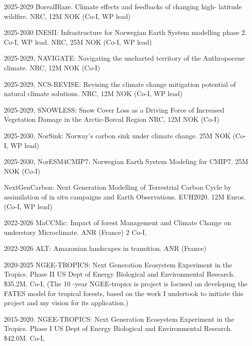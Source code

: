 \documentclass[10pt]{article}
\newenvironment{lonelist}[1][\enskip\textbullet]%
        {\vspace{-\baselineskip}\begin{list}{#1}{%
        \setlength{\itemindent}{-3pt} 
        \setlength{\partopsep}{0pt}%
        \setlength{\leftmargin}{10pt}
        \setlength{\topsep}{15pt}}}
        {\end{list}\vspace{-.3\baselineskip}}
\begin{document}
\begin{lonelist}

\item 2025-2029 BorealBlaze. Climate effects and feedbacks of changing high-
latitude wildfire.  NRC, 12M NOK (Co-I, WP lead) 

\item 2025-2030 INESII: Infrastructure for Norwegian Earth System modelling phase 2.  Co-I, WP lead. NRC, 25M NOK (Co-I, WP lead) 

\item 2025-2029, NAVIGATE: Navigating the uncharted territory of the Anthropocene climate. NRC, 12M NOK (Co-I) 

\item 2025-2029, NCS-REVISE: Revising the climate change mitigation potential of natural climate solutions. NRC, 12M NOK (Co-I, WP lead) 

\item 2025-2029, SNOWLESS:  Snow Cover Loss as a Driving Force of Increased Vegetation Damage in the Arctic-Boreal Region NRC, 12M NOK (Co-I) 

\item 2025-2030, NorSink: Norway’s carbon sink under climate change.  25M NOK (Co-I, WP lead) 

\item 2025-2030, NorESM4CMIP7: Norwegian Earth System Modeling for CMIP7. 25M NOK (Co-I) 

\item NextGenCarbon: Next Generation Modelling of Terrestrial Carbon Cycle by
assimilation of in situ campaigns and Earth Observations. EUH2020. 12M Euros.(Co-I, WP lead)  

\item 2022-2026 MaCCMic: Impact	of	forest	Management	and	Climate	Change	on	understory	Microclimate. ANR (France) 2 Co-I, 

\item 2022-2026 ALT: Amazonian landscapes in transition.  ANR (France) 

 \item 2020-2025 NGEE-TROPICS: Next Generation Ecosystem Experiment in the Tropics. Phase II US Dept of Energy Biological and Environmental Research. \$35.2M. Co-I, (The 10 -year NGEE-tropics is project is focused on developing the FATES model for tropical forests, based on the work I undertook to initiate this project and my vision for its application.) 

  \item 2015-2020. NGEE-TROPICS: Next Generation Ecosystem Experiment in the Tropics. Phase I US Dept of Energy Biological and Environmental Research. \$42.0M. Co-I,  
 

\end{lonelist}
\end{document}
